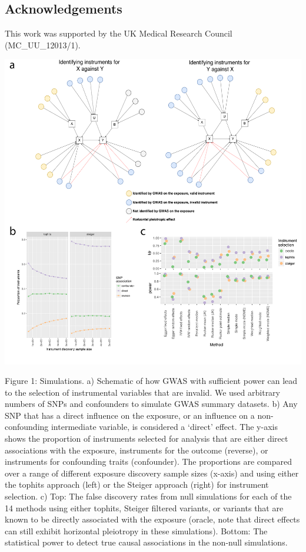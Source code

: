 \documentclass[]{article}
\begin{document}
\subsection{Acknowledgements}\label{acknowledgements}

This work was supported by the UK Medical Research Council
(MC\_UU\_12013/1).

\newpage

\includegraphics{images/fig1.pdf}

Figure 1: Simulations. a) Schematic of how GWAS with sufficient power
can lead to the selection of instrumental variables that are invalid. We
used arbitrary numbers of SNPs and confounders to simulate GWAS summary
datasets. b) Any SNP that has a direct influence on the exposure, or an
influence on a non-confounding intermediate variable, is considered a
`direct' effect. The y-axis shows the proportion of instruments selected
for analysis that are either direct associations with the exposure,
instruments for the outcome (reverse), or instruments for confounding
traits (confounder). The proportions are compared over a range of
different exposure discovery sample sizes (x-axis) and using either the
tophits approach (left) or the Steiger approach (right) for instrument
selection. c) Top: The false discovery rates from null simulations for
each of the 14 methods using either tophits, Steiger filtered variants,
or variants that are known to be directly associated with the exposure
(oracle, note that direct effects can still exhibit horizontal
pleiotropy in these simulations). Bottom: The statistical power to
detect true causal associations in the non-null simulations.
\end{document}
